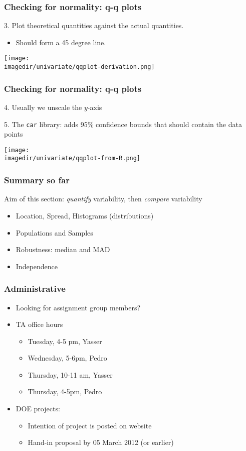 \begin{frame}\frametitle{Checking for normality: q-q plots}

	3. Plot theoretical quantities against the actual quantities.
	\begin{itemize}
		\item Should form a 45 degree line.
	\end{itemize}
	\begin{center}
		\texttt{[image: \\imagedir/univariate/qqplot-derivation.png]}
	\end{center}
\end{frame}

\begin{frame}\frametitle{Checking for normality: q-q plots}

	4. Usually we unscale the $y$-axis

	5. The \texttt{car} library: adds 95\% confidence bounds that should contain the data points
	\begin{center}
		\texttt{[image: \\imagedir/univariate/qqplot-from-R.png]}
	\end{center}
\end{frame}

\begin{frame}\frametitle{Summary so far}

	Aim of this section: \emph{quantify} variability, then \emph{compare} variability
	\begin{itemize}
		\item Location, Spread, Histograms (distributions)
		\item Populations and Samples
		\item Robustness: median and MAD
		\item Independence
	\end{itemize}
\end{frame}

\begin{frame}\frametitle{Administrative}
	\begin{itemize}
		\item Looking for assignment group members?
		\item TA office hours
		\begin{itemize}
			\item Tuesday, 4-5 pm, Yasser
			\item Wednesday, 5-6pm, Pedro
			\item Thursday, 10-11 am, Yasser
			\item Thursday, 4-5pm, Pedro
		\end{itemize}
		\item DOE projects:
		\begin{itemize}
			\item Intention of project is posted on website
			\item Hand-in proposal by 05 March 2012 (or earlier)
		\end{itemize}
	\end{itemize}
\end{frame}

